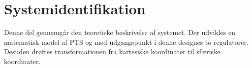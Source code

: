 \part{Systemidentifikation}
Denne del gennemgår den teoretiske beskrivelse af systemet.
Der udvikles en matematisk model af PTS
og med udgangspunkt i denne designes to regulatorer.
Desuden drøftes transformationen fra kartesiske koordinater til sfæriske koordinater.



%
